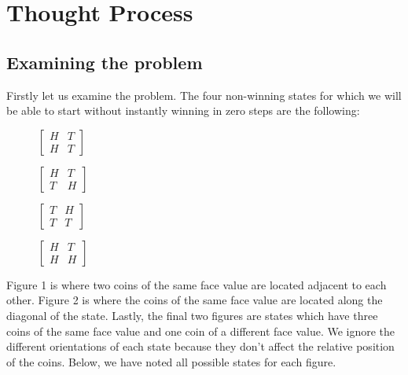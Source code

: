 \documentclass{article}
\begin{document}
\section{Thought Process}

\subsection{Examining the problem}

Firstly let us examine the problem. The four non-winning states for which we will be able to start without instantly winning in zero steps are the following:\\



\begin{figure}[h]
    \centering
    \begin{minipage}[t]{0.2\textwidth}
        $\begin{bmatrix}
        H & T \\
        H & T 
        \end{bmatrix}$
        \caption{}
    \end{minipage}
    \begin{minipage}[t]{0.2\textwidth}
       $\begin{bmatrix}
        H & T \\
        T & H 
        \end{bmatrix}$
        \caption{}
    \end{minipage}
    \begin{minipage}[t]{0.2\textwidth}
        $\begin{bmatrix}
        T & H \\
        T & T 
        \end{bmatrix}$
        \caption{}
    \end{minipage}
     \begin{minipage}[t]{0.2\textwidth}
        $\begin{bmatrix}
        H & T \\
        H & H 
        \end{bmatrix}$
        \caption{}
    \end{minipage}
\end{figure}
Figure 1 is where two coins of the same face value are located adjacent to each other. Figure 2 is where the coins of the same face value are located along the diagonal of the state. Lastly, the final two figures are states which have three coins of the same face value and one coin of a different face value. We ignore the different orientations of each state because they don't affect the relative position of the coins. Below, we have noted all possible states for each figure. 
\end{document}
